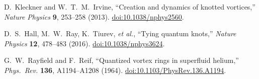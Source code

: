 \documentclass[a4paper,12pt]{article}
\begin{document}
\begin{thebibliography}{99}
        D.~Kleckner and W.~T.~M.~Irvine,
        ``Creation and dynamics of knotted vortices,''
        \emph{Nature Physics} \textbf{9}, 253--258 (2013).
        \href{https://doi.org/10.1038/nphys2560}{doi:10.1038/nphys2560}.

        D.~S.~Hall, M.~W.~Ray, K.~Tiurev, \emph{et al.},
        ``Tying quantum knots,''
        \emph{Nature Physics} \textbf{12}, 478--483 (2016).
        \href{https://doi.org/10.1038/nphys3624}{doi:10.1038/nphys3624}.

        G.~W.~Rayfield and F.~Reif,
        ``Quantized vortex rings in superfluid helium,''
        \emph{Phys.\ Rev.} \textbf{136}, A1194--A1208 (1964).
        \href{https://doi.org/10.1103/PhysRev.136.A1194}{doi:10.1103/PhysRev.136.A1194}.

    \end{thebibliography}
\end{document}
